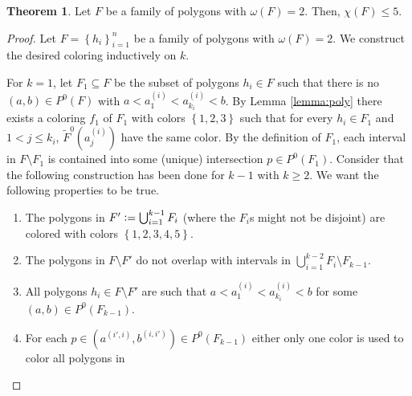 \documentclass[12pt]{article}
\theoremstyle{definition}
\newtheorem{thm}{Theorem}
\newcommand{\defeq}{\vcentcolon=}
\begin{document}
     \begin{thm}
         Let $F$ be a family of
         polygons with $\omega\left(F\right) = 2$.
         Then, $\chi\left(F\right) \leq 5$.
     \end{thm}
     \begin{proof}
         Let $F = \left\{h_{i}\right\}_{i = 1}^{n}$
         be a family of polygons with
         $\omega\left(F\right) = 2$.
         We construct the desired
         coloring inductively on $k$.

         For $k = 1$, let $F_1 \subseteq F$
         be the subset of polygons
         $h_{i} \in F$ such that 
         there is no $\left(a, b\right)
         \in P^{0}\left(F\right)$
         with $a < a_1^{\left(i\right)} <
         a_{k_{i}}^{\left(i\right)} < b$.
         By Lemma \ref{lemma:poly} there
         exists a coloring $f_1$ of $F_1$
         with colors $\left\{1, 2, 3\right\}$ 
         such that for every $h_{i} \in F_1$ 
         and $1 < j \leq k_{i}$,
         $\widetilde{F}^{0}\left(a_{j}^{\left(i\right)}\right)$ 
         have the same color.
         By the definition of $F_1$,
         each interval in $F \setminus F_1$ 
         is contained into some (unique)
         intersection $p \in P^{0}\left(F_1\right)$.
         Consider that the following construction 
         has been done for $k - 1$
         with $k \geq 2$. We want the 
         following properties to be true.
         \begin{enumerate}
             \item The polygons in $F' \defeq 
             \bigcup_{i =1}^{k-1} F_{i}$ 
             (where the $F_{i}$s might not
             be disjoint) are colored with colors
             $\left\{1, 2, 3, 4, 5\right\}$.
             \item The polygons in $F \setminus F'$ 
             do not overlap with
             intervals in
             $\bigcup_{i =1}^{k-2} F_{i} \setminus F_{k-1}$.
             \item All polygons
             $h_{i} \in F \setminus F'$ 
             are such that
             $a < a_1^{\left(i\right)}
             < a_{k_{i}}^{\left(i\right)} < b$
             for some
             $\left(a, b\right) \in P^{0}\left(F_{k-1}\right)$.
             \item For each
             $p \in \left(a^{\left(i', i\right)},
             b^{\left(i, i'\right)}\right)
             \in P^{0}\left(F_{k-1}\right)$ 
             either only one color is 
             used to color all polygons in

\end{enumerate}
\end{proof}
\end{document}
